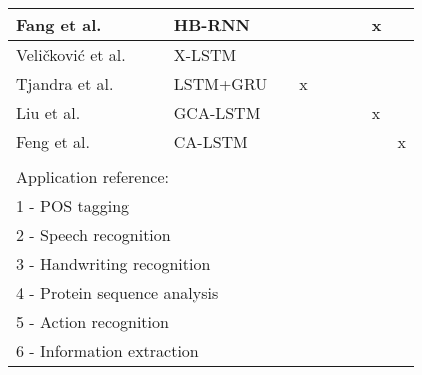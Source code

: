 \begin{landscape}
\begin{table}[!ht]
\begin{tabular}{l|l|l|l|l|l|l|l|l|l|l}
Fang et al. \cite{fang_deepasl:_2017}                        &                      &              & HB-RNN      &                               &             &        &             &         & x      &                        \\ \hline
Veli\v{c}kovi\'{c} et al. \cite{velickovic_cross-modal_2018} &                      &              & X-LSTM      &                               &             &        &             &         &        &                        \\ \hline
Tjandra et al. \cite{tjandra_gated_2016}                     &                      &              & LSTM+GRU    &                               & x           &        &             &         &        &                        \\ \hline
Liu et al. \cite{liu_global_2017}                            &                      &              & GCA-LSTM    &                               &             &        &             &         & x      &                        \\ \hline
Feng et al. \cite{feng_attention_2018}                       &                      &              & CA-LSTM     &                               &             &        &             &         &        & x                      \\ %
\multicolumn{11}{l}{}\\ \hline
\multicolumn{11}{l}{Application reference:}\\
\multicolumn{11}{l}{1 - POS tagging}\\
\multicolumn{11}{l}{2 - Speech recognition}\\
\multicolumn{11}{l}{3 - Handwriting	recognition}\\
\multicolumn{11}{l}{4 - Protein sequence analysis}\\
\multicolumn{11}{l}{5 - Action recognition}\\
\multicolumn{11}{l}{6 - Information extraction}\\ \hline
\end{tabular}
\end{table}
\end{landscape}